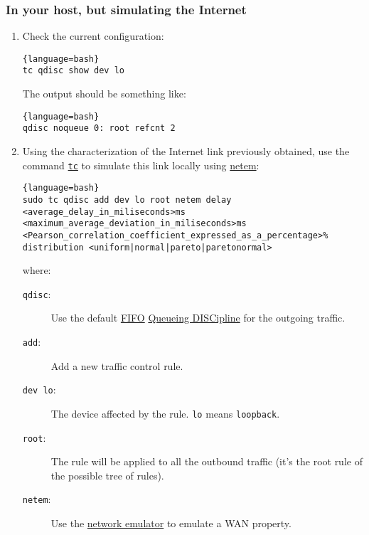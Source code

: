 \subsubsection{In your host, but simulating the Internet}

\begin{enumerate}

\item Check the current configuration:
  
  \begin{lstlisting}{language=bash}
tc qdisc show dev lo
  \end{lstlisting}
  
  The output should be something like:
  
  \begin{lstlisting}{language=bash}
qdisc noqueue 0: root refcnt 2
  \end{lstlisting}
  
\item Using the characterization of the Internet link previously
  obtained, use the command
  \href{https://man7.org/linux/man-pages/man8/tc.8.html}{\texttt{tc}}
  to simulate this link locally using
  \href{https://man7.org/linux/man-pages/man8/tc-netem.8.html}{netem}:

  \begin{lstlisting}{language=bash}
sudo tc qdisc add dev lo root netem delay <average_delay_in_miliseconds>ms <maximum_average_deviation_in_miliseconds>ms <Pearson_correlation_coefficient_expressed_as_a_percentage>% distribution <uniform|normal|pareto|paretonormal>
  \end{lstlisting}
  where:
  \begin{description}
  \item [\texttt{qdisc}:] Use the default
    \href{https://en.wikipedia.org/wiki/FIFO_(computing_and_electronics)}{FIFO}
    \href{https://wiki.debian.org/TrafficControl}{Queueing DISCipline}
    for the outgoing traffic.
  \item [\texttt{add}:] Add a new traffic control rule.
  \item [\texttt{dev lo}:] The device affected by the
    rule. \verb|lo| means \verb|loopback|.
  \item [\texttt{root}:] The rule will be applied to all the outbound
    traffic (it's the root rule of the possible tree of rules).
  \item [\texttt{netem}:] Use the
    \href{https://wiki.linuxfoundation.org/networking/netem}{network
      emulator} to emulate a WAN property.
  \end{description}


\end{enumerate}
